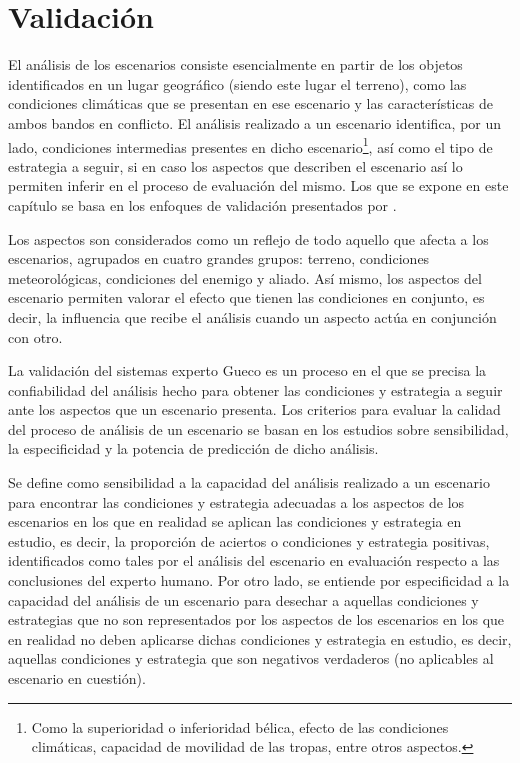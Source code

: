 \chapter{Validación}

El análisis de los escenarios consiste esencialmente en partir de los objetos identificados en un lugar geográfico (siendo este lugar el terreno), como las condiciones climáticas que se presentan en ese escenario y las características de ambos bandos en conflicto. El análisis realizado a un escenario identifica, por un lado, condiciones intermedias presentes en dicho escenario\footnote{Como la superioridad o inferioridad bélica, efecto de las condiciones climáticas, capacidad de movilidad de las tropas, entre otros aspectos.}, así como el tipo de estrategia a seguir, si en caso los aspectos que describen el escenario así lo permiten inferir en el proceso de evaluación del mismo. Los que se expone en este capítulo se basa en los enfoques de validación presentados por \citealt{Oleary88}.

Los aspectos son considerados como un reflejo de todo aquello que afecta a los escenarios, agrupados en cuatro grandes grupos: terreno, condiciones meteorológicas, condiciones del enemigo y aliado. Así mismo, los aspectos del escenario permiten valorar el efecto que tienen las condiciones en conjunto, es decir, la influencia que recibe el análisis cuando un aspecto actúa en conjunción con otro.

La validación del sistemas experto Gueco es un proceso en el que se precisa la confiabilidad del análisis hecho para obtener las condiciones y estrategia a seguir ante los aspectos que un escenario presenta. Los criterios para evaluar la calidad del proceso de análisis de un escenario se basan en los estudios sobre sensibilidad, la especificidad y la potencia de predicción de dicho análisis.

Se define como sensibilidad a la capacidad del análisis realizado a un escenario para encontrar las condiciones y estrategia adecuadas a los aspectos de los escenarios en los que en realidad se aplican las condiciones y estrategia en estudio, es decir, la proporción de aciertos o condiciones y estrategia positivas, identificados como tales por el análisis del escenario en evaluación respecto a las conclusiones del experto humano. Por otro lado, se entiende por especificidad a la capacidad del análisis de un escenario para desechar a aquellas condiciones y estrategias que no son representados por los aspectos de los escenarios en los que en realidad no deben aplicarse dichas condiciones y estrategia en estudio, es decir, aquellas condiciones y estrategia que son negativos verdaderos (no aplicables al escenario en cuestión).

